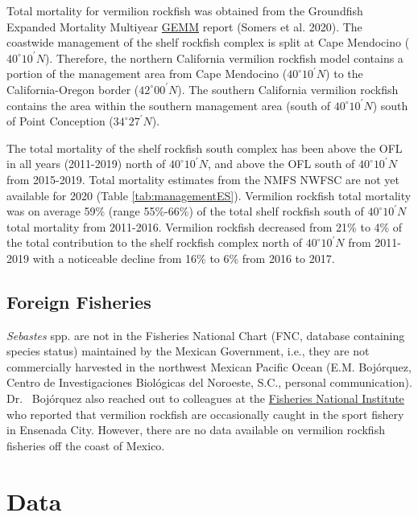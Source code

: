 \documentclass[
  english,
  a4paper,
]{article}
\begin{document}
Total mortality for vermilion rockfish was obtained from the Groundfish Expanded Mortality
Multiyear \href{https://www.nwfsc.noaa.gov/data/api/v1/source/observer.gemm_fact/selection.xlsx}{GEMM}
report (Somers et al. 2020). The coastwide management of the shelf rockfish complex is split at Cape
Mendocino ($40^\circ 10^\prime N$). Therefore, the northern California vermilion rockfish
model contains a portion of the management area from Cape Mendocino ($40^\circ 10^\prime N$)
to the California-Oregon border ($42^\circ 00^\prime N$). The southern California vermilion rockfish contains the
area within the southern management area (south of $40^\circ 10^\prime N$) south of Point Conception ($34^\circ 27^\prime N$).

The total mortality of the shelf rockfish
south complex has been above the OFL in all years (2011-2019) north of $40^\circ 10^\prime N$, and
above the OFL south of $40^\circ 10^\prime N$ from 2015-2019. Total mortality
estimates from the NMFS NWFSC are not yet available for 2020 (Table \ref{tab:managementES}). Vermilion rockfish total
mortality was on average 59\% (range 55\%-66\%) of the total shelf rockfish south
of $40^\circ 10^\prime N$ total mortality from 2011-2016. Vermilion rockfish decreased from 21\% to 4\% of
the total contribution to the shelf rockfish complex north of $40^\circ 10^\prime N$ from 2011-2019 with a
noticeable decline from 16\% to 6\% from 2016 to 2017.

\hypertarget{foreign-fisheries}{%
\subsection{Foreign Fisheries}\label{foreign-fisheries}}

\emph{Sebastes} spp. are not in the Fisheries National Chart (FNC, database containing
species status) maintained by the Mexican Government, i.e., they are not commercially
harvested in the northwest Mexican Pacific Ocean (E.M. Bojórquez, Centro de
Investigaciones Biológicas del Noroeste, S.C., personal communication). Dr.~
Bojórquez also reached out to colleagues at the
\href{https://www.gob.mx/inapesca}{Fisheries National Institute} who reported that
vermilion rockfish are occasionally caught in the sport fishery in Ensenada City.
However, there are no data available on vermilion rockfish fisheries off the coast
of Mexico.

\hypertarget{data}{%
\section{Data}\label{data}}
\end{document}
